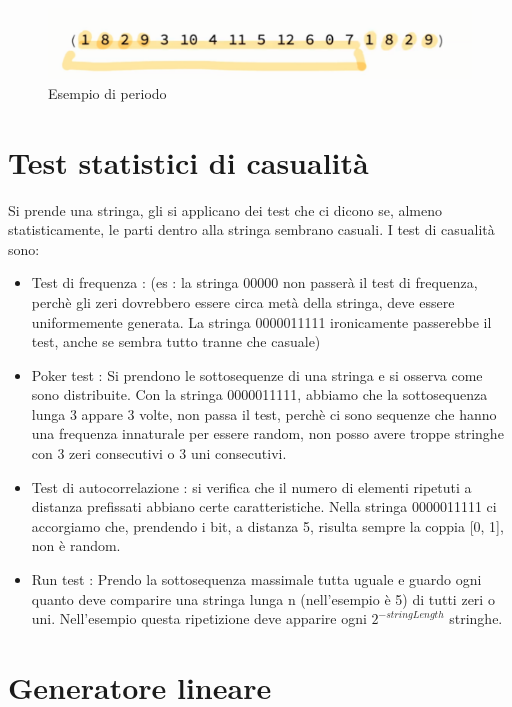 \begin{figure}[htp]
	\includegraphics[width=0.8\linewidth]{./img/periodo.png}
	\caption{Esempio di periodo}
	\label{img:periodo}
\end{figure}

\section{Test statistici di casualità}

Si prende una stringa, gli si applicano dei test che ci dicono se, almeno statisticamente, le parti dentro alla stringa sembrano casuali. I test di casualità sono:
\begin{itemize}
	\item Test di frequenza : (es : la stringa 00000 non passerà il test di frequenza, perchè gli zeri dovrebbero essere circa metà della stringa, deve essere uniformemente generata. La stringa 0000011111 ironicamente passerebbe il test, anche se sembra tutto tranne che casuale)
	\item Poker test :  Si prendono le sottosequenze di una stringa e si osserva come sono distribuite.  Con la stringa 0000011111, abbiamo che la sottosequenza lunga 3 appare 3 volte, non passa il test, perchè ci sono sequenze che hanno una frequenza innaturale per essere random, non posso avere troppe stringhe con 3 zeri consecutivi o 3 uni consecutivi.
	\item Test di autocorrelazione : si verifica che il numero di elementi ripetuti a distanza prefissati abbiano certe caratteristiche. Nella stringa 0000011111 ci accorgiamo che, prendendo i bit, a distanza 5, risulta sempre la coppia [0, 1], non è random.
	
	\item Run test : Prendo la sottosequenza massimale tutta uguale e guardo ogni quanto deve comparire una stringa lunga n (nell'esempio è 5) di tutti zeri o uni. Nell'esempio questa ripetizione deve apparire ogni $2^{-stringLength}$ stringhe.
\end{itemize}

\section{Generatore lineare}

